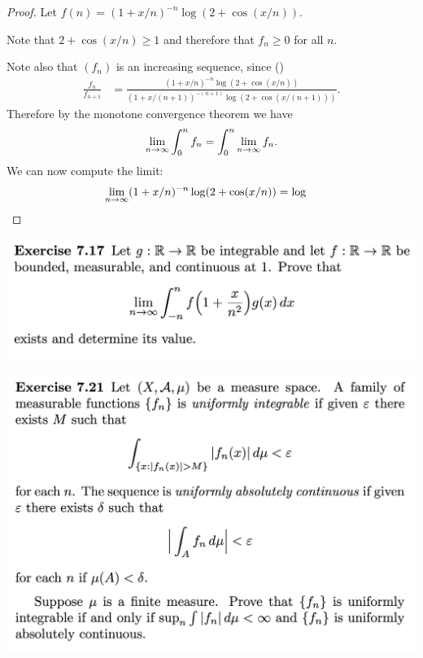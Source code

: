 \begin{proof}
  Let $f(n) = (1 + x/n)^{-n} \log(2 + \cos(x/n))$.

  Note that $2 + \cos(x/n) \geq 1$ and therefore that $f_n \geq 0$ for all $n$.

  Note also that $(f_n)$ is an increasing sequence, since ()
  \begin{align*}
    \frac{f_{n}}{f_{n+1}}
    &= \frac{(1 + x/n    )^{-n    } \log(2 + \cos(x/n   ))}
            {(1 + x/(n+1))^{-(n+1)} \log(2 + \cos(x/(n+1)))}.
  \end{align*}
  Therefore by the monotone convergence theorem we have
  \begin{align*}
    \limn \int_0^n f_n = \int_0^n \limn f_n.
  \end{align*}
  We can now compute the limit:
  \begin{align*}
    \limn (1 + x/n)^{-n} \log(2 + \cos(x/n))
    &= \log
  \end{align*}

\end{proof}

\begin{mdframed}
\includegraphics[width=400pt]{img/analysis--berkeley-202a-hw08-6e60.png}
\end{mdframed}


\begin{mdframed}
\includegraphics[width=400pt]{img/analysis--berkeley-202a-hw08-337f.png}
\end{mdframed}